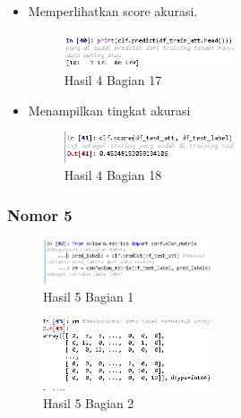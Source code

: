\begin{itemize}
\item Memperlihatkan score akurasi.

\begin{figure}[H]
\centerline{\includegraphics[width=5cm]{figures/1174089/3/praktek19.PNG}}
\caption{Hasil 4 Bagian 17}
\label{labelgambar}
\end{figure}

\item Menampilkan tingkat akurasi

\begin{figure}[H]
\centerline{\includegraphics[width=5cm]{figures/1174089/3/praktek20.PNG}}
\caption{Hasil 4 Bagian 18}
\label{labelgambar}
\end{figure}
\end{itemize}

\subsubsection{Nomor 5}
\hfill\break

\begin{figure}[H]
\centerline{\includegraphics[width=5cm]{figures/1174089/3/praktek21.PNG}}
\caption{Hasil 5 Bagian 1}
\label{labelgambar}
\end{figure}


\begin{figure}[H]
\centerline{\includegraphics[width=5cm]{figures/1174089/3/praktek22.PNG}}
\caption{Hasil 5 Bagian 2}
\label{labelgambar}
\end{figure}

